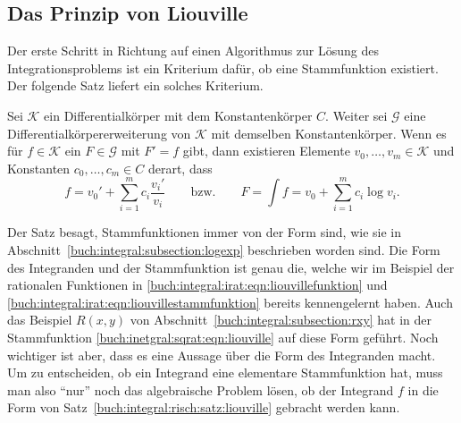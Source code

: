 %
%
%
\subsection{Das Prinzip von Liouville
\label{buch:integral:risch:subsection:liouville}}
Der erste Schritt in Richtung auf einen Algorithmus zur Lösung des
Integrationsproblems ist ein Kriterium dafür, ob eine Stammfunktion
existiert.
Der folgende Satz liefert ein solches Kriterium.

\begin{satz}
\label{buch:integral:risch:satz:liouville}
%
Sei $\mathcal{K}$ ein Differentialkörper mit dem Konstantenkörper $C$.
Weiter sei $\mathcal{G}$ eine Differentialkörpererweiterung von $\mathcal{K}$
mit demselben Konstantenkörper.
Wenn es für $f\in\mathcal{K}$ ein $F\in\mathcal{G}$ mit $F'=f$ gibt,
dann existieren Elemente $v_0,\dots,v_m\in\mathcal{K}$ und
Konstanten $c_0,\dots,c_m\in C$ derart, dass
\[
f = v_0' + \sum_{i=1}^m c_i\frac{v_i'}{v_i}
\qquad\text{bzw.}\qquad
F
=
\int f
=
v_0 + \sum_{i=1}^m c_i \log v_i.
\]
\end{satz}

Der Satz besagt, Stammfunktionen immer von der Form sind, wie sie in
Abschnitt~\ref{buch:integral:subsection:logexp} beschrieben worden sind.
Die Form des Integranden und der Stammfunktion ist genau die, 
welche wir im Beispiel der rationalen Funktionen in
\eqref{buch:integral:irat:eqn:liouvillefunktion}
und
\eqref{buch:integral:irat:eqn:liouvillestammfunktion}
bereits kennengelernt haben.
Auch das Beispiel $R(x,y)$ von Abschnitt~\ref{buch:integral:subsection:rxy}
hat in der Stammfunktion \eqref{buch:inetgral:sqrat:eqn:liouville}
auf diese Form geführt.
Noch wichtiger ist aber, dass es eine Aussage über die Form des
Integranden macht.
Um zu entscheiden, ob ein Integrand eine elementare Stammfunktion
hat, muss man also  ``nur'' noch das algebraische Problem lösen,
ob der Integrand $f$ in die Form von
Satz~\ref{buch:integral:risch:satz:liouville}
gebracht werden kann.

